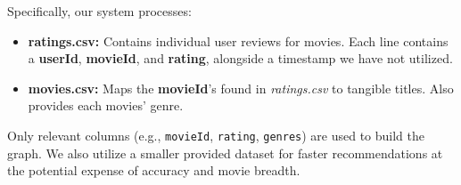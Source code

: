 \documentclass[12pt]{article}
\begin{document}
Specifically, our system processes:
\begin{itemize}
    \item \textbf{ratings.csv:} Contains individual user reviews for movies. Each line contains a \textbf{userId}, \textbf{movieId}, and \textbf{rating}, alongside a timestamp we have not utilized.
    \item \textbf{movies.csv:} Maps the \textbf{movieId}'s found in \textit{ratings.csv} to tangible titles. Also provides each movies' genre.
\end{itemize}

Only relevant columns (e.g., \texttt{movieId}, \texttt{rating}, \texttt{genres}) are used to build the graph. We also utilize a smaller provided dataset for faster recommendations at the potential expense of accuracy and movie breadth.
\end{document}
